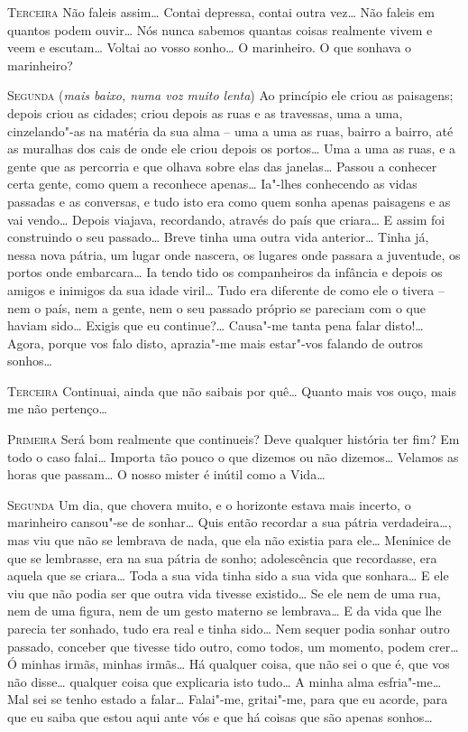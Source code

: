 \textsc{Terceira} Não faleis assim\ldots{} 
Contai depressa, contai outra vez\ldots{} Não
faleis em quantos podem ouvir\ldots{} 
Nós nunca sabemos quantas coisas
realmente vivem e veem e escutam\ldots{} 
Voltai ao vosso sonho\ldots{} O
marinheiro. O que sonhava o marinheiro?

\textsc{Segunda} (\textit{mais baixo, numa voz muito lenta}) 
Ao princípio ele criou as paisagens; depois criou as
cidades; criou depois as ruas e as travessas, uma a uma, 
cinzelando"-as na matéria da sua alma -- uma a
uma as ruas, bairro a bairro, até as muralhas dos cais 
de onde ele criou depois os portos\ldots{} Uma a uma as
ruas, e a gente que as percorria
e que olhava sobre elas das janelas\ldots{} 
Passou a conhecer certa gente,
como quem a reconhece apenas\ldots{} Ia"-lhes
conhecendo as vidas passadas
e as conversas, e tudo isto era como quem sonha 
apenas paisagens e as vai vendo\ldots{} 
Depois viajava, recordando, através do país que criara\ldots{}
E assim foi construindo o seu passado\ldots{}
Breve tinha uma outra vida
anterior\ldots{} Tinha já, nessa nova pátria, um lugar
onde nascera, os lugares onde passara a juventude, os
portos onde embarcara\ldots{} Ia tendo tido os companheiros
da infância e depois os amigos e inimigos da sua
idade viril\ldots{} Tudo era diferente de como ele o
tivera -- nem o país, nem a gente, nem o seu passado 
próprio se pareciam com o que haviam sido\ldots{} 
Exigis que eu continue?\ldots{} Causa"-me tanta pena falar
disto!\ldots{} Agora, porque vos falo disto, aprazia"-me
mais estar"-vos falando de outros sonhos\ldots{} 

\textsc{Terceira} Continuai, ainda que não saibais
por quê\ldots{} Quanto mais vos
ouço, mais me não pertenço\ldots{}

\textsc{Primeira} Será bom realmente que continueis? 
Deve qualquer história ter fim? Em todo o caso 
falai\ldots{} Importa tão pouco o que dizemos ou não
dizemos\ldots{} Velamos as horas que passam\ldots{} 
O nosso mister é inútil como a Vida\ldots{}

\textsc{Segunda} Um dia, que chovera muito, e o horizonte
estava mais incerto, o marinheiro cansou"-se de
sonhar\ldots{} Quis então recordar a sua pátria
verdadeira\ldots{}, mas viu que não se lembrava 
de nada, que ela não existia
para ele\ldots{} Meninice de que se lembrasse,
era na sua pátria de sonho;
adolescência que recordasse, era aquela que se
criara\ldots{} Toda a sua
vida tinha sido a sua vida que sonhara\ldots{} 
E ele viu que não podia ser
que outra vida tivesse existido\ldots{} 
Se ele nem de uma rua, nem de uma
figura, nem de um gesto materno se lembrava\ldots{} 
E da vida que lhe parecia ter sonhado, tudo era real
e tinha sido\ldots{} Nem sequer podia sonhar outro passado,
conceber que tivesse tido outro, como todos, um
momento, podem crer\ldots{} Ó minhas irmãs,
minhas irmãs\ldots{} Há qualquer
coisa, que não sei o que é, que vos não
disse\ldots{} qualquer coisa que
explicaria isto tudo\ldots{} A minha alma 
esfria"-me\ldots{} Mal sei se tenho
estado a falar\ldots{} Falai"-me, gritai"-me,
para que eu acorde, para que
eu saiba que estou aqui ante vós e que há coisas que são apenas
sonhos\ldots{}

